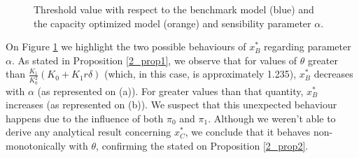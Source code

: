 	\begin{figure}[!htb]
		\begin{subfigmatrix}{2}
		\end{subfigmatrix}
		\caption{Threshold value with respect to the benchmark model (blue) and the capacity optimized model (orange) and sensibility parameter $\alpha$.}
		\label{fig:2_x4}
	\end{figure}
	
On Figure \ref{fig:2_x4} we highlight the two possible behaviours of $x^*_B$ regarding parameter $\alpha$. As stated in Proposition \ref{2_prop1}, we observe that for values of $\theta$ greater than $\frac{K_1}{ K_0^2} (K_0+K_1 r \delta)$ (which, in this case, is approximately 1.235), $x^*_B$ decreases with $\alpha$ (as represented on (a)). For greater values than that quantity, $x^*_B$ increases (as represented on (b)). We suspect that this unexpected behaviour happens due to the influence of both $\pi_0$ and $\pi_1$.
Although we weren't able to derive any analytical result concerning $x^*_C$, we conclude that it behaves non-monotonically with $\theta$, confirming the stated on Proposition \ref{2_prop2}.




